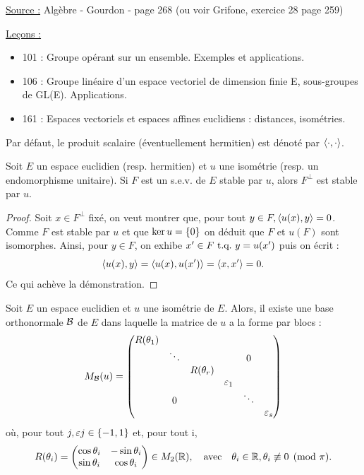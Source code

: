 

\pagestyle{fancy}

\fancyhead[R]{}



\underline{Source :} Algèbre - Gourdon - page 268 (ou voir Grifone, exercice 28 page 259) \newline

\underline{Leçons :}
\begin{itemize}
\item 101 : Groupe opérant sur un ensemble. Exemples et applications.
\item 106 : Groupe linéaire d’un espace vectoriel de dimension finie E, sous-groupes de GL(E). Applications.
\item 161 : Espaces vectoriels et espaces affines euclidiens : distances, isométries.
\end{itemize}

\begin{nota}
Par défaut, le produit scalaire (éventuellement hermitien) est dénoté par $\langle\cdot, \cdot\rangle$.
\end{nota}

\begin{lem}
\label{lem:stab}
Soit $E$ un espace euclidien (resp. hermitien) et $u$ une isométrie (resp. un endomorphisme unitaire). 
Si $F$ est un s.e.v. de $E$ stable par $u$, alors $F^{\perp}$ est stable par $u$.
\end{lem}

\begin{proof}
Soit $x \in F^{\perp}$ fixé, on veut montrer que, pour tout $y \in F, \langle u(x), y\rangle = 0$.
Comme $F$ est stable par $u$ et que $\ker{u} = \{ 0 \}$ on déduit que $F$ et $u(F)$ sont isomorphes.
Ainsi, pour $y \in F$, on exhibe $x' \in F \text{~t.q.~} y = u(x')$ puis on écrit :
\[ \langle u(x), y\rangle = \langle u(x), u(x')\rangle = \langle x, x'\rangle = 0 . \] 
Ce qui achève la démonstration. 
\end{proof}

\begin{thm}
Soit $E$ un espace euclidien et $u$ une isométrie de $E$. Alors, il existe une base orthonormale $\mathcal{B}$ de $E$ 
dans laquelle la matrice de $u$ a la forme par blocs :
\begin{equation}
M_{\mathcal{B}}(u) = \begin{pmatrix}
R(\theta_1) & & & & & \\
 & \ddots & & & 0 & \\
 & & R(\theta_r) & & & \\
 & & & \varepsilon_1 & & \\
 & 0 & & & \ddots & \\
 & & & & & \varepsilon_s
\end{pmatrix}
\end{equation}
où, pour tout $j, \varepsilon{j} \in \{ -1,1 \}$ et, pour tout i,
\[ R(\theta_i) = \begin{pmatrix} \cos{\theta_i} & - \sin{\theta_i} \\ \sin{\theta_i} & \cos{\theta_i} \end{pmatrix} \in M_2(\mathbb{R}), \quad
\text{avec} \quad \theta_i \in \mathbb{R}, \theta_i \not \equiv 0 \pmod \pi. \]
\end{thm}

